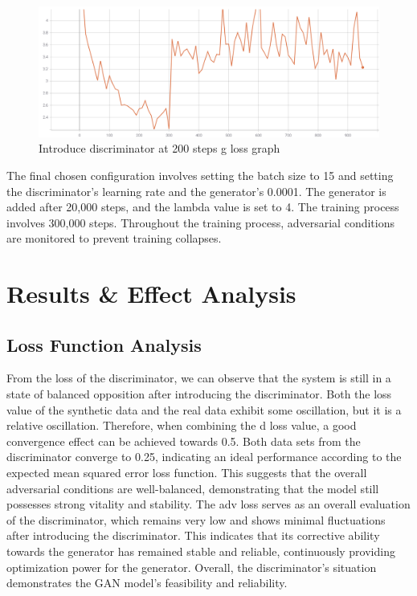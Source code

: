 \documentclass[10pt,journal,compsoc]{IEEEtran}
\begin{document}
\begin{figure}
    \centering
    \includegraphics[scale=0.6] {PNG/3-8.png}
    \caption{Introduce discriminator at 200 steps g loss graph}
    \label{fig:3-8}
\end{figure}

The final chosen configuration involves setting the batch size to 15 and setting the discriminator's learning rate and the generator's 0.0001. The generator is added after 20,000 steps, and the lambda value is set to 4. The training process involves 300,000 steps. Throughout the training process, adversarial conditions are monitored to prevent training collapses.

\section{Results \& Effect Analysis}

\subsection{Loss Function Analysis}

From the loss of the discriminator, we can observe that the system is still in a state of balanced opposition after introducing the discriminator. Both the loss value of the synthetic data and the real data exhibit some oscillation, but it is a relative oscillation. Therefore, when combining the d loss value, a good convergence effect can be achieved towards 0.5. Both data sets from the discriminator converge to 0.25, indicating an ideal performance according to the expected mean squared error loss function. This suggests that the overall adversarial conditions are well-balanced, demonstrating that the model still possesses strong vitality and stability. The adv loss serves as an overall evaluation of the discriminator, which remains very low and shows minimal fluctuations after introducing the discriminator. This indicates that its corrective ability towards the generator has remained stable and reliable, continuously providing optimization power for the generator. Overall, the discriminator's situation demonstrates the GAN model's feasibility and reliability.
\end{document}
